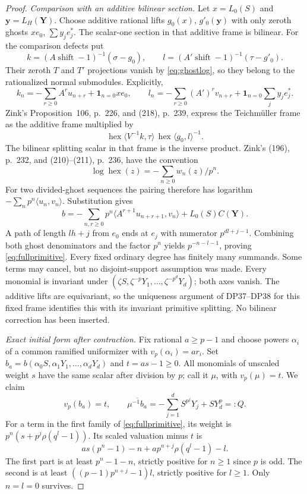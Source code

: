 \documentclass[11pt,a4paper]{article}
\theoremstyle{definition}\newtheorem{remark}[theorem]{Remark}
\newcommand{\vp}{v_p}\newcommand{\dR}{\mathrm{dR}}\newcommand{\crys}{\mathrm{crys}}
\begin{document}
\begin{proof}
\emph{Comparison with an additive bilinear section.}
Let $x=L_0(S)$ and $\mathbf y=L_H(\mathbf Y)$. Choose additive rational lifts $g_0(x)$, $g'_0(\mathbf y)$ with only zeroth ghosts $xe_0$, $\sum y_je_j^*$. The scalar-one section in that additive frame is bilinear. For the comparison defects put
\[
 k=(A\operatorname{shift}-1)^{-1}(\sigma-g_0),\qquad
 l=(A'\operatorname{shift}-1)^{-1}(\tau-g'_0).
\]
Their zeroth $T$ and $T'$ projections vanish by \eqref{eq:ghostlog}, so they belong to the rationalized normal submodules. Explicitly,
\[
 k_n=-\sum_{r\ge0}A^ru_{n+r}+\mathbf1_{n=0}xe_0,\qquad
 l_n=-\sum_{r\ge0}(A')^rv_{n+r}
                 +\mathbf1_{n=0}\sum_jy_je_j^*.
\]
Zink's Proposition~106, p.~226, and (218), p.~239, express the Teichm\"uller frame as the additive frame multiplied by
\[
 \operatorname{hex}\langle V^{-1}k,\tau\rangle\,
 \operatorname{hex}\langle g_0,l\rangle^{-1}.
\]
The bilinear splitting scalar in that frame is the inverse product. Zink's (196), p.~232, and (210)--(211), p.~236, have the convention
\[
 \log\operatorname{hex}(z)=-\sum_{n\ge0}w_n(z)/p^n.
\]
For two divided-ghost sequences the pairing therefore has logarithm
$-\sum_np^n\langle u_n,v_n\rangle$. Substitution gives
\[
 b=-\sum_{n,r\ge0}p^n\langle A^{r+1}u_{n+r+1},v_n\rangle
          +L_0(S)C(\mathbf Y).
\]
A path of length $lh+j$ from $e_0$ ends at $e_j$ with numerator $p^{dl+j-1}$. Combining both ghost denominators and the factor $p^n$ yields $p^{-n-l-1}$, proving \eqref{eq:fullprimitive}. Every fixed ordinary degree has finitely many summands. Some terms may cancel, but no disjoint-support assumption was made. Every monomial is invariant under
$(\zeta S,\zeta^{-p}Y_1,\ldots,\zeta^{-p^d}Y_d)$; both axes vanish. The additive lifts are equivariant, so the uniqueness argument of DP37--DP38 for this fixed frame identifies this with its invariant primitive splitting. No bilinear correction has been inserted.

\emph{Exact initial form after contraction.}
Fix rational $a\ge p-1$ and choose powers $\alpha_i$ of a common ramified uniformizer with $\vp(\alpha_i)=ar_i$. Set
$b_a=b(\alpha_0S,\alpha_1Y_1,\ldots,\alpha_dY_d)$ and $t=as-1\ge0$.
All monomials of unscaled weight $s$ have the same scalar after division by $p$; call it $\mu$, with $\vp(\mu)=t$. We claim
\begin{equation}\label{eq:primitiveinitial}
 \vp(b_a)=t,\qquad
 \overline{\mu^{-1}b_a}
       =-\sum_{j=1}^dS^{p^j}Y_j+SY_d^p=:Q.
\end{equation}
For a term in the first family of \eqref{eq:fullprimitive}, its weight is
$p^n(s+p^j\rho(q^l-1))$. Its scaled valuation minus $t$ is
\[
 as(p^n-1)-n+a p^{n+j}\rho(q^l-1)-l.
\]
The first part is at least $p^n-1-n$, strictly positive for $n\ge1$ since $p$ is odd. The second is at least $((p-1)p^{n+j}-1)l$, strictly positive for $l\ge1$. Only $n=l=0$ survives.


\end{proof}
\end{document}
